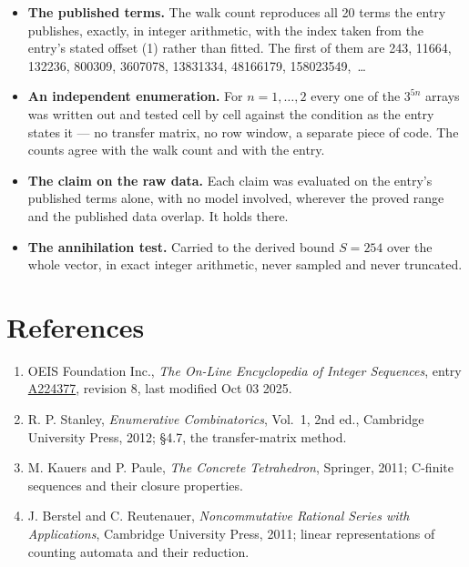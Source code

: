 \documentclass[11pt]{article}
\theoremstyle{definition}
\begin{document}
\begin{itemize}

\item {\bfseries The published terms.} The walk count reproduces all 20 terms the entry publishes, exactly, in integer arithmetic, with the index taken from the entry's stated offset (1) rather than fitted. The first of them are 243, 11664, 132236, 800309, 3607078, 13831334, 48166179, 158023549,~\dots

\item {\bfseries An independent enumeration.} For $n = 1,\dots,2$ every one of the $3^{5n}$ arrays was written out and tested cell by cell against the condition as the entry states it --- no transfer matrix, no row window, a separate piece of code. The counts agree with the walk count and with the entry.

\item {\bfseries The claim on the raw data.} Each claim was evaluated on the entry's published terms alone, with no model involved, wherever the proved range and the published data overlap. It holds there.

\item {\bfseries The annihilation test.} Carried to the derived bound $S = 254$ over the whole vector, in exact integer arithmetic, never sampled and never truncated.

\end{itemize}

\section{References}

\begin{enumerate}

\item OEIS Foundation Inc., \emph{The On-Line Encyclopedia of Integer Sequences}, entry \href{https://oeis.org/A224377}{A224377}, revision 8, last modified Oct 03 2025.

\item R. P. Stanley, \emph{Enumerative Combinatorics}, Vol.~1, 2nd ed., Cambridge University Press, 2012; \S4.7, the transfer-matrix method.

\item M. Kauers and P. Paule, \emph{The Concrete Tetrahedron}, Springer, 2011; C-finite sequences and their closure properties.

\item J. Berstel and C. Reutenauer, \emph{Noncommutative Rational Series with Applications}, Cambridge University Press, 2011; linear representations of counting automata and their reduction.

\end{enumerate}
\end{document}
